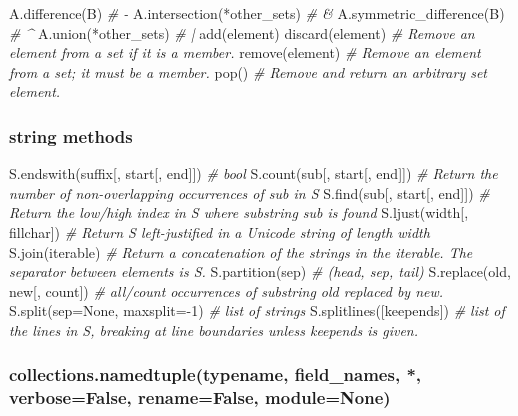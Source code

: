 \documentclass[11pt]{article}
\newenvironment{Shaded}{}{}
\newcommand{\DecValTok}[1]{\textcolor[rgb]{0.25,0.63,0.44}{{#1}}}
\newcommand{\CommentTok}[1]{\textcolor[rgb]{0.38,0.63,0.69}{\textit{{#1}}}}
\newcommand{\NormalTok}[1]{{#1}}
\newcommand{\VariableTok}[1]{\textcolor[rgb]{0.10,0.09,0.49}{{#1}}}
\newcommand{\OperatorTok}[1]{\textcolor[rgb]{0.40,0.40,0.40}{{#1}}}
\begin{document}
\begin{Shaded}
\begin{Highlighting}[]
\NormalTok{A.difference(B) }\CommentTok{# -}
\NormalTok{A.intersection(}\OperatorTok{*}\NormalTok{other_sets) }\CommentTok{# &}
\NormalTok{A.symmetric_difference(B) }\CommentTok{# ^}
\NormalTok{A.union(}\OperatorTok{*}\NormalTok{other_sets) }\CommentTok{# |}
\NormalTok{add(element)}
\NormalTok{discard(element) }\CommentTok{# Remove an element from a set if it is a member.}
\NormalTok{remove(element) }\CommentTok{# Remove an element from a set; it must be a member.}
\NormalTok{pop() }\CommentTok{# Remove and return an arbitrary set element.}
\end{Highlighting}
\end{Shaded}

\subsubsection{string methods}\label{string-methods}

\begin{Shaded}
\begin{Highlighting}[]
\NormalTok{S.endswith(suffix[, start[, end]]) }\CommentTok{# bool}
\NormalTok{S.count(sub[, start[, end]]) }\CommentTok{# Return the number of non-overlapping occurrences of sub in S}
\NormalTok{S.find(sub[, start[, end]]) }\CommentTok{# Return the low/high index in S where substring sub is found}
\NormalTok{S.ljust(width[, fillchar]) }\CommentTok{# Return S left-justified in a Unicode string of length width}
\NormalTok{S.join(iterable) }\CommentTok{# Return a concatenation of the strings in the iterable.  The separator between elements is S.}
\NormalTok{S.partition(sep) }\CommentTok{# (head, sep, tail)}
\NormalTok{S.replace(old, new[, count]) }\CommentTok{# all/count occurrences of substring old replaced by new.}
\NormalTok{S.split(sep}\OperatorTok{=}\VariableTok{None}\NormalTok{, maxsplit}\OperatorTok{=-}\DecValTok{1}\NormalTok{) }\CommentTok{# list of strings}
\NormalTok{S.splitlines([keepends]) }\CommentTok{# list of the lines in S, breaking at line boundaries unless keepends is given.}
\end{Highlighting}
\end{Shaded}

\subsubsection{collections.namedtuple(typename, field\_names, *,
verbose=False, rename=False,
module=None)}\label{collections.namedtupletypename-field_names-verbosefalse-renamefalse-modulenone}
\end{document}

